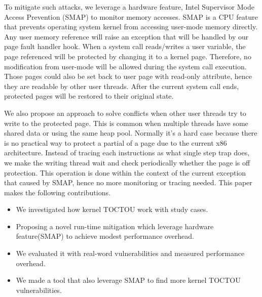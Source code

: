 To mitigate such attacks, we leverage a hardware feature, Intel Supervisor Mode Access Prevention (SMAP) to monitor memory accesses. SMAP is a CPU feature that prevents operating system kernel from accessing user-mode memory directly. Any user memory reference will raise an exception that will be handled by our page fault handler hook. When a system call reads/writes a user variable, the page referenced will be protected by changing it to a kernel page. Therefore, no modification from user-mode will be allowed during the system call execution. Those pages could also be set back to user page with read-only attribute, hence they are readable by other user threads. After the current system call ends, protected pages will be restored to their original state.

We also propose an approach to solve conflicts when other user threads try to write to the protected page. This is common when multiple threads have some shared data or using the same heap pool. Normally it's a hard case because there is no practical way to protect a partial of a page due to the current x86 architecture. Instead of tracing each instructions as what single step trap does, we make the writing thread wait and check periodically whether the page is off protection. This operation is done within the context of the current exception that caused by SMAP, hence no more monitoring or tracing needed. This paper makes the following contributions.


\begin{itemize}[leftmargin=*]
    \item We investigated how kernel TOCTOU work with study cases.
    \item Proposing a novel run-time mitigation which leverage hardware feature(SMAP) to achieve modest performance overhead. 
    \item We evaluated it with real-word vulnerabilities and measured performance overhead.
    \item We made a tool that also leverage SMAP to find more kernel TOCTOU vulnerabilities.
\end{itemize}

